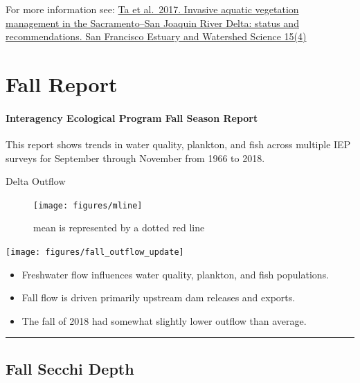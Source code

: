 \documentclass[
]{book}
\providecommand{\tightlist}{%
  \setlength{\itemsep}{0pt}\setlength{\parskip}{0pt}}
\begin{document}
\begin{disclaimer}
For more information see:
\href{https://escholarship.org/uc/item/828355w6}{Ta et al.~2017.
Invasive aquatic vegetation management in the Sacramento--San Joaquin
River Delta: status and recommendations. San Francisco Estuary and
Watershed Science 15(4)}
\end{disclaimer}

\hypertarget{Fall}{%
\chapter{Fall Report}\label{Fall}}

\hypertarget{interagency-ecological-program-fall-season-report}{%
\subsubsection{Interagency Ecological Program Fall Season Report}\label{interagency-ecological-program-fall-season-report}}

This report shows trends in water quality, plankton, and fish across multiple IEP
surveys for September through November from 1966 to 2018.

Delta Outflow

\begin{figure}
\texttt{[image: figures/mline]} \caption{mean is represented by a dotted red line}\label{fig:unnamed-chunk-92}
\end{figure}

\texttt{[image: figures/fall\_outflow\_update]}

\begin{itemize}
\tightlist
\item
  Freshwater flow influences water quality, plankton, and fish populations.
\item
  Fall flow is driven primarily upstream dam releases and exports.
\item
  The fall of 2018 had somewhat slightly lower outflow than average.
\end{itemize}

\begin{center}\rule{0.5\linewidth}{0.5pt}\end{center}

\hypertarget{fall-secchi-depth}{%
\section{Fall Secchi Depth}\label{fall-secchi-depth}}
\end{document}
